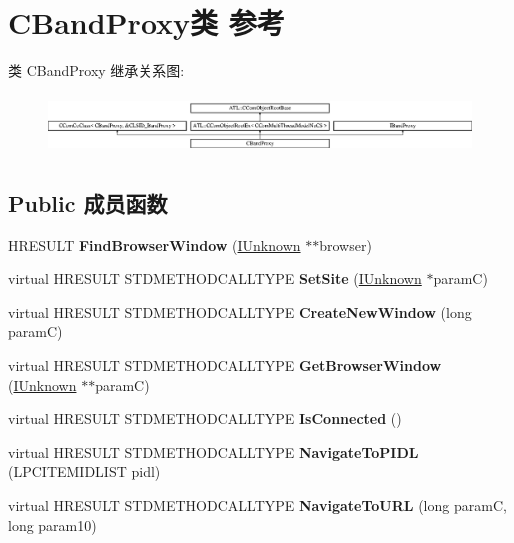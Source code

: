 \hypertarget{class_c_band_proxy}{}\section{C\+Band\+Proxy类 参考}
\label{class_c_band_proxy}
类 C\+Band\+Proxy 继承关系图\+:\begin{figure}[H]
\begin{center}
\leavevmode
\includegraphics[height=1.590909cm]{class_c_band_proxy}
\end{center}
\end{figure}
\subsection*{Public 成员函数}
\begin{DoxyCompactItemize}
\item 
\mbox{\label{class_c_band_proxy_acb89348ab7c7ae970d68d22a8938ada2}} 
H\+R\+E\+S\+U\+LT {\bfseries Find\+Browser\+Window} (\hyperlink{interface_i_unknown}{I\+Unknown} $\ast$$\ast$browser)
\item 
\mbox{\label{class_c_band_proxy_ab92de70c47fe09797787daa0693d2c45}} 
virtual H\+R\+E\+S\+U\+LT S\+T\+D\+M\+E\+T\+H\+O\+D\+C\+A\+L\+L\+T\+Y\+PE {\bfseries Set\+Site} (\hyperlink{interface_i_unknown}{I\+Unknown} $\ast$paramC)
\item 
\mbox{\label{class_c_band_proxy_a6b4b9f83320e5fe1c721b5b322aab9fd}} 
virtual H\+R\+E\+S\+U\+LT S\+T\+D\+M\+E\+T\+H\+O\+D\+C\+A\+L\+L\+T\+Y\+PE {\bfseries Create\+New\+Window} (long paramC)
\item 
\mbox{\label{class_c_band_proxy_a3fc70dca168e5c07115d12d42061dbee}} 
virtual H\+R\+E\+S\+U\+LT S\+T\+D\+M\+E\+T\+H\+O\+D\+C\+A\+L\+L\+T\+Y\+PE {\bfseries Get\+Browser\+Window} (\hyperlink{interface_i_unknown}{I\+Unknown} $\ast$$\ast$paramC)
\item 
\mbox{\label{class_c_band_proxy_a1b9194ea1c53944db5fd504595065369}} 
virtual H\+R\+E\+S\+U\+LT S\+T\+D\+M\+E\+T\+H\+O\+D\+C\+A\+L\+L\+T\+Y\+PE {\bfseries Is\+Connected} ()
\item 
\mbox{\label{class_c_band_proxy_afbbb0c2e5e2c2a53515c1bebb58f9b90}} 
virtual H\+R\+E\+S\+U\+LT S\+T\+D\+M\+E\+T\+H\+O\+D\+C\+A\+L\+L\+T\+Y\+PE {\bfseries Navigate\+To\+P\+I\+DL} (L\+P\+C\+I\+T\+E\+M\+I\+D\+L\+I\+ST pidl)
\item 
\mbox{\label{class_c_band_proxy_a64d682bdb0be0cc1d44385d238233337}} 
virtual H\+R\+E\+S\+U\+LT S\+T\+D\+M\+E\+T\+H\+O\+D\+C\+A\+L\+L\+T\+Y\+PE {\bfseries Navigate\+To\+U\+RL} (long paramC, long param10)
\end{DoxyCompactItemize}

